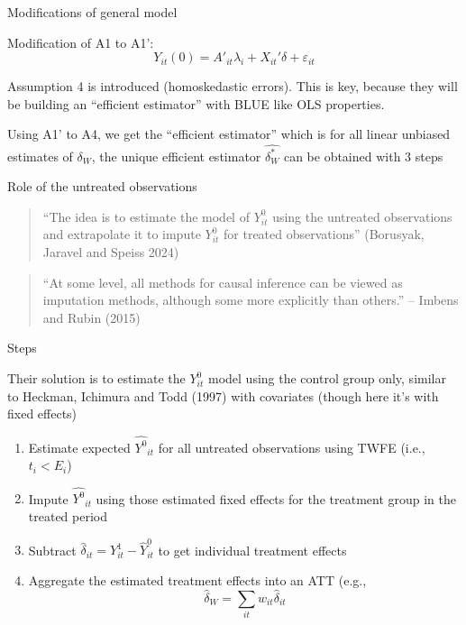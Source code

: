 \documentclass{beamer}
\begin{document}
\begin{frame}{Modifications of general model}


Modification of A1 to A1': $$ Y_{it}(0) = A'_{it} \lambda_i + X_{it}' \delta + \varepsilon_{it}$$

\bigskip

Assumption 4 is introduced (homoskedastic errors).  This is key, because they will be building an ``efficient estimator'' with BLUE like OLS properties. 

\bigskip

Using A1' to A4, we get the ``efficient estimator'' which is for all linear unbiased estimates of $\delta_W$, the unique efficient estimator $\widehat{\delta_W^*}$ can be obtained with 3 steps

\end{frame}


\begin{frame}{Role of the untreated observations}


\begin{quote}
``The idea is to estimate the model of $Y_{it}^0$ using the untreated observations and extrapolate it to impute $Y_{it}^0$ for treated observations'' (Borusyak, Jaravel and Speiss 2024)
\end{quote}

\bigskip 

\begin{quote}
``At some level, all methods for causal inference can be viewed as imputation methods, although some more explicitly than others.'' -- Imbens and Rubin (2015)
\end{quote}


\end{frame}

\begin{frame}{Steps}

Their solution is to estimate the $Y^0_{it}$ model using the control group only, similar to Heckman, Ichimura and Todd (1997) with covariates (though here it's with fixed effects)

\begin{enumerate}
\item Estimate expected $\widehat{Y^0}_{it}$ for all untreated observations using TWFE (i.e., $t_i<E_i$)
\item Impute $\widehat{Y^0}_{it}$ using those estimated fixed effects for the treatment group in the treated period
\item Subtract $\widehat{\delta}_{it} = Y_{it}^1 - \widehat{Y}_{it}^0$ to get individual treatment effects
\item Aggregate the estimated treatment effects into an ATT (e.g.,  $$\widehat{\delta}_W = \sum_{it}w_{it}\widehat{\delta}_{it}$$
\end{enumerate}

\end{frame}
\end{document}
